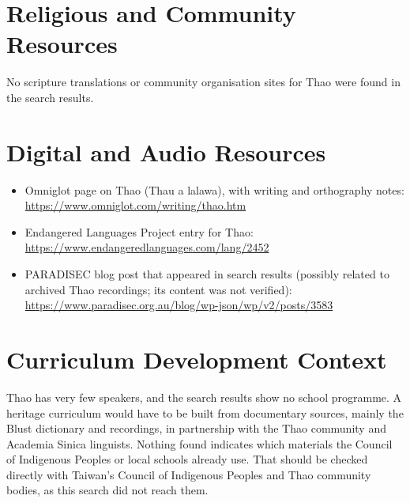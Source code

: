 \documentclass[12pt]{article}
\begin{document}
\section{Religious and Community Resources}
No scripture translations or community organisation sites for Thao were found in the search results.

\section{Digital and Audio Resources}
\begin{itemize}
\item Omniglot page on Thao (Thau a lalawa), with writing and orthography notes: \url{https://www.omniglot.com/writing/thao.htm}
\item Endangered Languages Project entry for Thao: \url{https://www.endangeredlanguages.com/lang/2452}
\item PARADISEC blog post that appeared in search results (possibly related to archived Thao recordings; its content was not verified): \url{https://www.paradisec.org.au/blog/wp-json/wp/v2/posts/3583}
\end{itemize}

\section{Curriculum Development Context}
Thao has very few speakers, and the search results show no school programme. A heritage curriculum would have to be built from documentary sources, mainly the Blust dictionary and recordings, in partnership with the Thao community and Academia Sinica linguists. Nothing found indicates which materials the Council of Indigenous Peoples or local schools already use. That should be checked directly with Taiwan's Council of Indigenous Peoples and Thao community bodies, as this search did not reach them.
\end{document}
